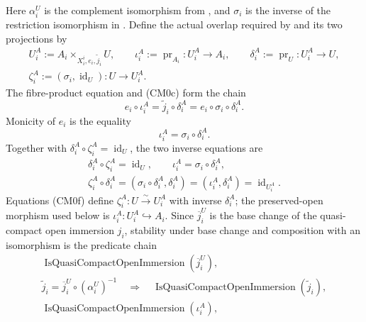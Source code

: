 \begin{definition}
\begin{enumerate}
\[      \]
      Here \(\alpha_i^U\) is the complement isomorphism from
      , and \(\sigma_i\) is the inverse
      of the restriction isomorphism in
      .
      Define the actual overlap required by
       and its two projections by
      \[
      \begin{gathered}
        U_i^A:=A_i\times_{X_i^i,e_i,\widetilde j_i}U,
        \qquad
        \iota_i^A:=\operatorname{pr}_{A_i}\colon U_i^A\to A_i,
        \qquad
        \delta_i^A:=\operatorname{pr}_U\colon U_i^A\to U,\\
        \zeta_i^A:=(\sigma_i,\operatorname{id}_U)
          \colon U\longrightarrow U_i^A.
      \end{gathered}
      \]
      The fibre-product equation and (CM0c) form the chain
      \[
        e_i\circ\iota_i^A
          =\widetilde j_i\circ\delta_i^A
          =e_i\circ\sigma_i\circ\delta_i^A.
      \]
      Monicity of \(e_i\) is the equality
      \[
        \iota_i^A=\sigma_i\circ\delta_i^A.
      \]
      Together with \(\delta_i^A\circ\zeta_i^A=\operatorname{id}_U\), the two
      inverse equations are
      \[
      \begin{gathered}
        \delta_i^A\circ\zeta_i^A=\operatorname{id}_U,
        \qquad
        \iota_i^A=\sigma_i\circ\delta_i^A,\\
        \zeta_i^A\circ\delta_i^A
          =(\sigma_i\circ\delta_i^A,\delta_i^A)
          =(\iota_i^A,\delta_i^A)=\operatorname{id}_{U_i^A}.
      \end{gathered}                                               \tag{CM0f}
      \]
      Equations (CM0f) define
      \(\zeta_i^A\colon U\xrightarrow{\sim}U_i^A\) with inverse
      \(\delta_i^A\); the preserved-open morphism used below is
      \(\iota_i^A\colon U_i^A\hookrightarrow A_i\).
      Since \(\overline j_i^U\) is the base change of the quasi-compact open
      immersion \(j_i\), stability under base change and composition with an
      isomorphism is the predicate chain
      \[
      \begin{gathered}
        \operatorname{IsQuasiCompactOpenImmersion}(\overline j_i^U),\\
        \widetilde j_i=\overline j_i^U\circ(\alpha_i^U)^{-1}
          \quad\Longrightarrow\quad
        \operatorname{IsQuasiCompactOpenImmersion}(\widetilde j_i),\\
        \operatorname{IsQuasiCompactOpenImmersion}(\iota_i^A),
      \end{gathered}                                               \tag{CM0f'}
\]
\end{enumerate}
\end{definition}
